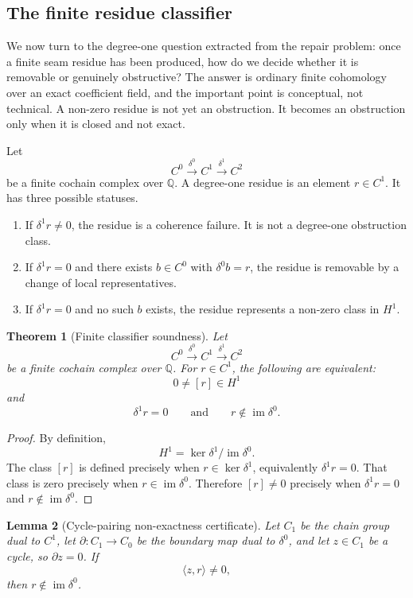 \documentclass[11pt]{article}
\newtheorem{theorem}{Theorem}[section]
\newtheorem{lemma}[theorem]{Lemma}
\newcommand{\im}{\operatorname{im}}
\newcommand{\Q}{\mathbb{Q}}
\begin{document}
\subsection{The finite residue classifier}

We now turn to the degree-one question extracted from the repair problem: once a finite seam residue has been produced, how do we decide whether it is removable or genuinely obstructive? The answer is ordinary finite cohomology over an exact coefficient field, and the important point is conceptual, not technical. A non-zero residue is not yet an obstruction. It becomes an obstruction only when it is closed and not exact.

Let
\[
C^0\xrightarrow{\delta^0}C^1\xrightarrow{\delta^1}C^2
\]
be a finite cochain complex over \(\Q\). A degree-one residue is an element \(r\in C^1\). It has three possible statuses.

\begin{enumerate}[label=(\arabic*)]
\item If \(\delta^1r\neq 0\), the residue is a coherence failure. It is not a degree-one obstruction class.
\item If \(\delta^1r=0\) and there exists \(b\in C^0\) with \(\delta^0b=r\), the residue is removable by a change of local representatives.
\item If \(\delta^1r=0\) and no such \(b\) exists, the residue represents a non-zero class in \(H^1\).
\end{enumerate}

\begin{theorem}[Finite classifier soundness]\label{thm:classifier-soundness}
Let
\[
C^0\xrightarrow{\delta^0}C^1\xrightarrow{\delta^1}C^2
\]
be a finite cochain complex over \(\Q\). For \(r\in C^1\), the following are equivalent:
\[
0\neq [r]\in H^1
\]
and
\[
\delta^1r=0
\qquad\text{and}\qquad
r\notin \im\delta^0.
\]
\end{theorem}

\begin{proof}
By definition,
\[
H^1=\ker \delta^1/\im\delta^0.
\]
The class \([r]\) is defined precisely when \(r\in \ker\delta^1\), equivalently \(\delta^1r=0\). That class is zero precisely when \(r\in \im\delta^0\). Therefore \([r]\neq 0\) precisely when \(\delta^1r=0\) and \(r\notin\im\delta^0\).
\end{proof}

\begin{lemma}[Cycle-pairing non-exactness certificate]\label{lem:cycle-pairing}
Let \(C_1\) be the chain group dual to \(C^1\), let \(\partial:C_1\to C_0\) be the boundary map dual to \(\delta^0\), and let \(z\in C_1\) be a cycle, so \(\partial z=0\). If
\[
\langle z,r\rangle\neq 0,
\]
then \(r\notin \im\delta^0\).
\end{lemma}
\end{document}
